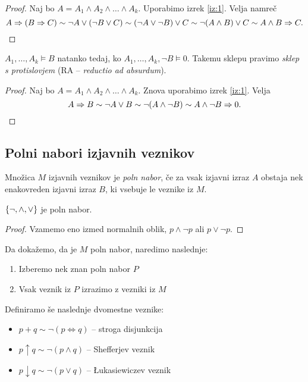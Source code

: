 \documentclass[12pt, a4paper]{article}
\renewcommand{\implies}{\Rightarrow}
\renewcommand{\iff}{\Leftrightarrow}
\begin{document}
\begin{proof}
Naj bo $A=A_1\land A_2\land\dots\land A_k$. Uporabimo izrek \ref{iz:1}. Velja namreč
\[
A\implies(B\implies C)\sim \neg A\lor(\neg B\lor C)\sim(\neg A\lor\neg B)\lor C\sim \neg(A\land B)\lor C\sim A\land B\implies C.\qedhere
\]
\end{proof}

\begin{izrek}
$A_1,\dots,A_k\models B$ natanko tedaj, ko $A_1,\dots,A_k,\neg B\models 0$. Takemu sklepu pravimo \emph{sklep s protislovjem} (RA -- \emph{reductio ad absurdum}).
\end{izrek}

\begin{proof}
Naj bo $A=A_1\land A_2\land\dots\land A_k$. Znova uporabimo izrek \ref{iz:1}. Velja
\[
A\implies B\sim \neg A\lor B\sim \neg(A\land\neg B)\sim A\land\neg B\implies 0.\qedhere
\]
\end{proof}

\newpage

\subsection{Polni nabori izjavnih veznikov}

\begin{okvir}
\begin{definicija}
Množica $M$ izjavnih veznikov je \emph{poln nabor}, če za vsak izjavni izraz $A$ obstaja nek enakovreden izjavni izraz $B$, ki vsebuje le veznike iz $M$.
\end{definicija}
\end{okvir}

\begin{izrek}
$\left\{\neg,\land,\lor\right\}$ je poln nabor.
\end{izrek}

\begin{proof}
Vzamemo eno izmed normalnih oblik, $p\land\neg p$ ali $p\lor\neg p$.
\end{proof}

Da dokažemo, da je $M$ poln nabor, naredimo naslednje:

\begin{enumerate}
\item Izberemo nek znan poln nabor $P$
\item Vsak veznik iz $P$ izrazimo z vezniki iz $M$
\end{enumerate}

\begin{definicija}
Definiramo še naslednje dvomestne veznike:

\begin{itemize}
\item $p+q\sim\neg(p\iff q)$ -- stroga disjunkcija
\item $p\uparrow q\sim\neg(p\land q)$ -- Shefferjev veznik
\item $p\downarrow q\sim\neg(p\lor q)$ -- Łukasiewiczev veznik
\end{itemize}
\end{definicija}
\end{document}
